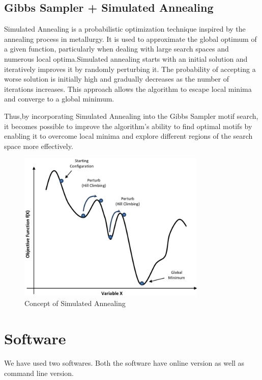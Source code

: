 \documentclass{article}
\begin{document}
\begin{Large}
\subsection{Gibbs Sampler + Simulated Annealing}
Simulated Annealing is a probabilistic optimization technique inspired by the annealing process in metallurgy. It is used to approximate the global optimum of a given function, particularly when dealing with large search spaces and numerous local optima.Simulated annealing starts with an initial solution and iteratively improves it by randomly perturbing it. The probability of accepting a worse solution is initially high and gradually decreases as the number of iterations increases. This approach allows the algorithm to escape local minima and converge to a global minimum. 

Thus,by incorporating Simulated Annealing into the Gibbs Sampler motif search, it becomes possible to improve the algorithm's ability to find optimal motifs by enabling it to overcome local minima and explore different regions of the search space more effectively.
\begin{figure}[h]
    \centering
    \includegraphics[width=0.8\textwidth]{methods/simulated-annealing.png}
    \caption{Concept of Simulated Annealing}
\end{figure}

\section{Software}
We have used two softwares. Both the software have online version as well as command line version.

\end{Large}
\end{document}
